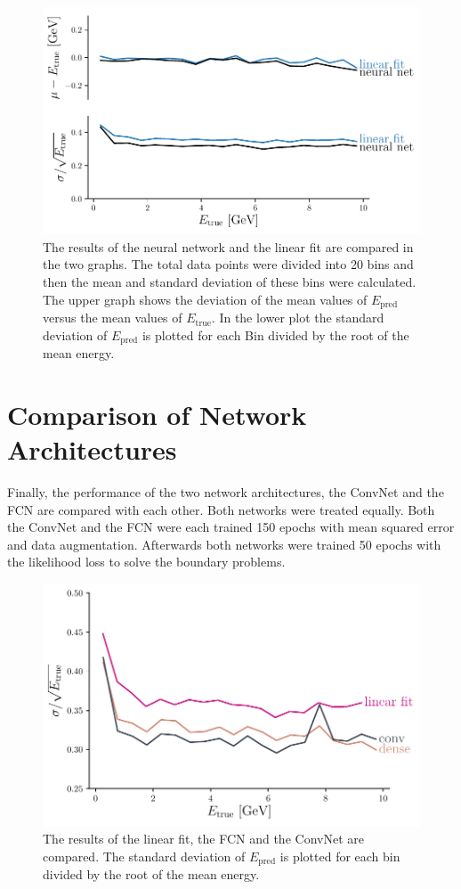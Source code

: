 \documentclass[12pt, a4paper]{thesis}
\begin{document}
\begin{figure}[H]
  \centering
  \includegraphics[width=.9\linewidth]{../images/likelihood_res.pdf}
  \caption{ The results of the neural network and the linear fit are
    compared in the two graphs. The total data points were divided into
    20 bins and then the mean and standard deviation of these bins were
    calculated. The upper graph shows the deviation of the mean values
    of \(E_{\text{pred}}\) versus the mean values of \(E_{\text{true}}\). In the lower plot the
    standard deviation of \(E_{\text{pred}}\) is plotted for each Bin divided by the
    root of the mean energy.}
  \label{likelihood_res}
\end{figure}

\section{Comparison of Network Architectures}
\label{sec:org1df3a0b}

Finally, the performance of the two network architectures, the ConvNet
and the FCN are compared with each other. Both networks were treated
equally. Both the ConvNet and the FCN were each trained 150 epochs
with mean squared error and data augmentation. Afterwards both
networks were trained 50 epochs with the likelihood loss to solve the
boundary problems.

\begin{figure}[H]
  \centering
  \includegraphics[width=.9\linewidth]{../images/arch_comparison.pdf}
  \caption{ The results of the linear fit, the FCN and the ConvNet are
    compared. The standard deviation of \(E_{\text{pred}}\) is plotted
    for each bin divided by the root of the mean energy.}
  \label{arch_comparison}
\end{figure}
\end{document}
